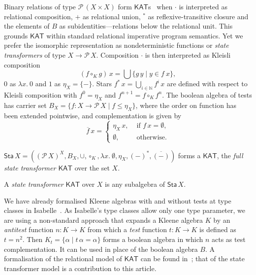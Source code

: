 \documentclass[envcountsames]{llncs}
\newcommand{\KAT}{\mathsf{KAT}}
\newcommand{\Pow}{\mathcal{P}}
\newcommand{\sta}{\mathsf{Sta}}
\begin{document}
Binary relations of type $\Pow\, (X\times X)$ form
$\KAT$s~\cite{Kozen97} when $\cdot$ is interpreted as relational
composition, $+$ as relational union, $^\ast$ as reflexive-transitive
closure and the elements of $B$ as subidentities---relations below the
relational unit. This grounds $\KAT$ within standard relational
imperative program semantics. Yet we prefer the isomorphic
representation as nondeterministic functions or \emph{state
  transformers} of type $X\to \Pow\, X$.  Composition $\cdot$ is then
interpreted as Kleisli composition
\begin{equation*} 
(f\circ_K g)\, x = \bigcup\{g\, y\mid y \in f\ x \}, 
\end{equation*} 
$0$ as $\lambda x.\ 0$ and $1$ as $\eta_X = \{-\}$.  Stars
$f^{\ast}\, x = \bigcup_{i\in\mathbb{N}} f^i\, x$ are defined with
  respect to Kleisli composition with $f^{0} = \eta_X$ and
  $f^{n+1} = f \circ_K f^{n}$. The boolean algebra of tests has
  carrier set $B_X=\{f:X\to \Pow\, X \mid f\le \eta_X\}$, where the
  order on function has been extended pointwise,  and complementation
  is given by
  \begin{equation*} 
    \overline{f}\, x =
  \begin{cases}
    \eta_X\, x, & \text{ if } f\, x = \emptyset,\\
\emptyset, & \text{ otherwise}.
  \end{cases}
\end{equation*}

\begin{proposition}\label{P:kleisli-ka}
$\sta\, X = ((\Pow\, X)^X,B_X,\cup,\circ_K,\lambda x.\
  \emptyset, \eta_X,(-)^{\ast},\overline{(-)})$
  forms a $\KAT$, the \emph{full state transformer $\KAT$} over the
  set $X$.
\end{proposition}
A \emph{state transformer $\KAT$} over $X$ is any subalgebra of
$\sta\, X$. 

We have already formalised Kleene algebras with and without tests at
type classes in Isabelle~\cite{afp:ka,afp:kat}.  As Isabelle's type
classes allow only one type parameter, we are using a non-standard
approach that expands a Kleene algebra $K$ by an \emph{antitest}
function $n:K\to K$ from which a \emph{test} function $t:K\to K$ is
defined as $t=n^2$. Then $K_t = \{\alpha \mid t\, \alpha = \alpha\}$
forms a boolean algebra in which $n$ acts as test complementation. It
can be used in place of the boolean algebra $B$.  A formalisation of
the relational model of $\KAT$ can be found in~\cite{afp:kat}; that of
the state transformer model is a contribution to this article.
\end{document}

